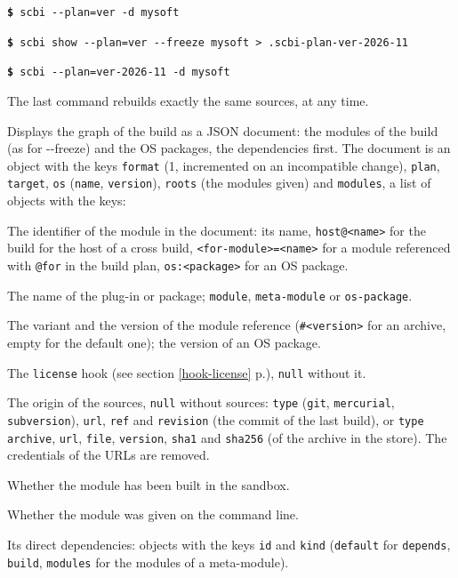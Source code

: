 \documentclass[a4paper,12pt,twoside]{article}
\newcommand{\code}[1]{\texttt{#1}}
\newcommand{\seeref}[1]{see section \ref{#1} p.\pageref{#1}}
\newcommand{\cmd}[1]{\tabto{1cm}\hspace{0.5cm}\texttt{\textbf{\$} #1}}
\newcommand{\ddash}{-{}-}
\begin{document}
\begin{description}[font=\texttt]
	\cmd{scbi \ddash{}plan=ver -d mysoft}

	\cmd{scbi show \ddash{}plan=ver \ddash{}freeze mysoft > .scbi-plan-ver-2026-11}

	\cmd{scbi \ddash{}plan=ver-2026-11 -d mysoft}

	The last command rebuilds exactly the same sources, at any time.

	\item[\ddash{}json] Displays the graph of the build as a JSON document: the modules of the build (as for \ddash{}freeze) and the OS packages, the dependencies first. The document is an object with the keys \code{format} (1, incremented on an incompatible change), \code{plan}, \code{target}, \code{os} (\code{name}, \code{version}), \code{roots} (the modules given) and \code{modules}, a list of objects with the keys:
	\begin{description}[font=\texttt,style=nextline]
		\item[id] The identifier of the module in the document: its name, \code{host@<name>} for the build for the host of a cross build, \code{<for-module>=<name>} for a module referenced with \code{@for} in the build plan, \code{os:<package>} for an OS package.
		\item[name, type] The name of the plug-in or package; \code{module}, \code{meta-module} or \code{os-package}.
		\item[variant, version] The variant and the version of the module reference (\code{\#<version>} for an archive, empty for the default one); the version of an OS package.
		\item[license] The \code{license} hook (\seeref{hook-license}), \code{null} without it.
		\item[source] The origin of the sources, \code{null} without sources: \code{type} (\code{git}, \code{mercurial}, \code{subversion}), \code{url}, \code{ref} and \code{revision} (the commit of the last build), or \code{type} \code{archive}, \code{url}, \code{file}, \code{version}, \code{sha1} and \code{sha256} (of the archive in the store). The credentials of the URLs are removed.
		\item[built] Whether the module has been built in the sandbox.
		\item[root] Whether the module was given on the command line.
		\item[depends] Its direct dependencies: objects with the keys \code{id} and \code{kind} (\code{default} for \code{depends}, \code{build}, \code{modules} for the modules of a meta-module).
	\end{description}


\end{description}
\end{document}
